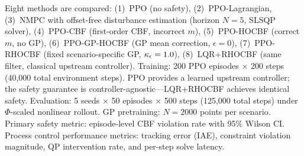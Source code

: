 Eight methods are compared: (1)~PPO (no safety), (2)~PPO-Lagrangian, (3)~NMPC with offset-free disturbance estimation (horizon $N=5$, SLSQP solver), (4)~PPO-CBF (first-order CBF, incorrect $m$), (5)~PPO-HOCBF (correct $m$, no GP), (6)~PPO-GP-HOCBF (GP mean correction, $\epsilon=0$), (7)~PPO-RHOCBF (fixed scenario-specific GP, $\kappa_\epsilon=1.0$), (8)~LQR+RHOCBF (same filter, classical upstream controller). Training: 200 PPO episodes $\times$ 200 steps (40,000 total environment steps). PPO provides a learned upstream controller; the safety guarantee is controller-agnostic---LQR+RHOCBF achieves identical safety. Evaluation: 5 seeds $\times$ 50 episodes $\times$ 500 steps (125,000 total steps) under $\Phi$-scaled nonlinear rollout. GP pretraining: $N=2000$ points per scenario. Primary safety metric: episode-level CBF violation rate with 95\% Wilson CI. Process control performance metrics: tracking error (IAE), constraint violation magnitude, QP intervention rate, and per-step solve latency.
